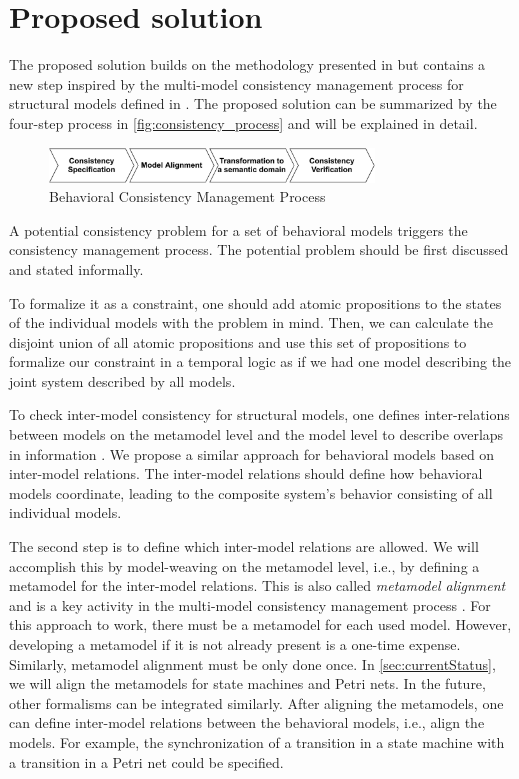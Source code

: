 \documentclass[conference]{IEEEtran}
\begin{document}
\section{Proposed solution}
The proposed solution builds on the methodology presented in \cite{engelsMethodologySpecifyingAnalyzing2001} but contains a new step inspired by the multi-model consistency management process for structural models defined in \cite{stunkelMultipleModelSynchronization2020}.
The proposed solution can be summarized by the four-step process in \autoref{fig:consistency_process} and will be explained in detail.

\begin{figure}[h]
    \centering
    \includegraphics[width=3.4in]{methodology}
    \caption{Behavioral Consistency Management Process}
    \label{fig:consistency_process}
\end{figure}
A potential consistency problem for a set of behavioral models triggers the consistency management process.
The potential problem should be first discussed and stated informally.

To formalize it as a constraint, one should add atomic propositions to the states of the individual models with the problem in mind.
Then, we can calculate the disjoint union of all atomic propositions and use this set of propositions to formalize our constraint in a temporal logic as if we had one model describing the joint system described by all models.

To check inter-model consistency for structural models, one defines inter-relations between models on the metamodel level and the model level to describe overlaps in information \cite{stunkelMultipleModelSynchronization2020}.
We propose a similar approach for behavioral models based on inter-model relations.
The inter-model relations should define how behavioral models coordinate, leading to the composite system's behavior consisting of all individual models.

The second step is to define which inter-model relations are allowed.
We will accomplish this by model-weaving on the metamodel level, i.e., by defining a metamodel for the inter-model relations.
This is also called \textit{metamodel alignment} and is a key activity in the multi-model consistency management process \cite{stunkelMultipleModelSynchronization2020}.
For this approach to work, there must be a metamodel for each used model.
However, developing a metamodel if it is not already present is a one-time expense.
Similarly, metamodel alignment must be only done once.
In \autoref{sec:currentStatus}, we will align the metamodels for state machines and Petri nets.
In the future, other formalisms can be integrated similarly.
After aligning the metamodels, one can define inter-model relations between the behavioral models, i.e., align the models.
For example, the synchronization of a transition in a state machine with a transition in a Petri net could be specified.
\end{document}

